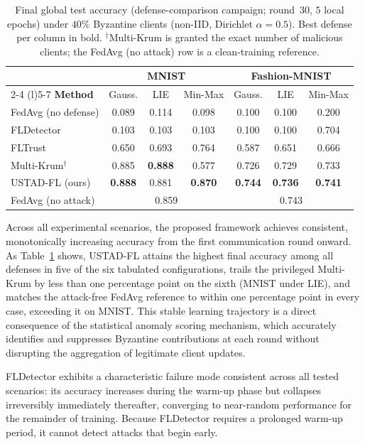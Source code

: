 \documentclass[journal]{IEEEtran}
\begin{document}
\begin{table}[t]
\centering
\caption{Final global test accuracy (defense-comparison campaign; round~$30$, $5$ local epochs) under $40\%$ Byzantine clients (non-IID, Dirichlet $\alpha=0.5$). Best defense per column in bold. $^\dagger$Multi-Krum is granted the exact number of malicious clients; the FedAvg (no attack) row is a clean-training reference.}
\label{tab:main_results}
\footnotesize
\setlength{\tabcolsep}{3pt}
\begin{tabular}{@{}lcccccc@{}}
\toprule
& \multicolumn{3}{c}{\textbf{MNIST}} & \multicolumn{3}{c}{\textbf{Fashion-MNIST}} \\
\cmidrule(lr){2-4} \cmidrule(l){5-7}
\textbf{Method} & Gauss. & LIE & Min-Max & Gauss. & LIE & Min-Max \\
\midrule
FedAvg (no defense) & 0.089 & 0.114 & 0.098 & 0.100 & 0.100 & 0.200 \\
FLDetector & 0.103 & 0.103 & 0.103 & 0.100 & 0.100 & 0.704 \\
FLTrust & 0.650 & 0.693 & 0.764 & 0.587 & 0.651 & 0.666 \\
Multi-Krum$^\dagger$ & 0.885 & \textbf{0.888} & 0.577 & 0.726 & 0.729 & 0.733 \\
USTAD-FL (ours) & \textbf{0.888} & 0.881 & \textbf{0.870} & \textbf{0.744} & \textbf{0.736} & \textbf{0.741} \\
\midrule
FedAvg (no attack) & \multicolumn{3}{c}{0.859} & \multicolumn{3}{c}{0.743} \\
\bottomrule
\end{tabular}
\end{table}

Across all experimental scenarios, the proposed framework achieves consistent, monotonically increasing accuracy from the first communication round onward. As Table~\ref{tab:main_results} shows, USTAD-FL attains the highest final accuracy among all defenses in five of the six tabulated configurations, trails the privileged Multi-Krum by less than one percentage point on the sixth (MNIST under LIE), and matches the attack-free FedAvg reference to within one percentage point in every case, exceeding it on MNIST. This stable learning trajectory is a direct consequence of the statistical anomaly scoring mechanism, which accurately identifies and suppresses Byzantine contributions at each round without disrupting the aggregation of legitimate client updates.

FLDetector exhibits a characteristic failure mode consistent across all tested scenarios: its accuracy increases during the warm-up phase but collapses irreversibly immediately thereafter, converging to near-random performance for the remainder of training. Because FLDetector requires a prolonged warm-up period, it cannot detect attacks that begin early.
\end{document}
